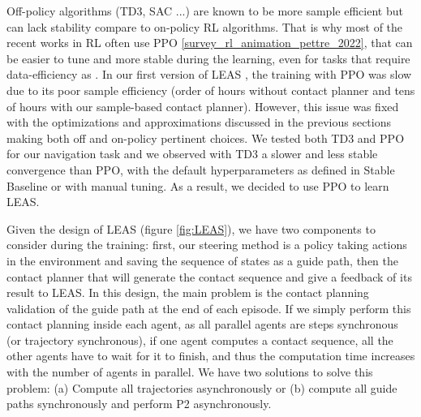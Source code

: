 Off-policy algorithms (TD3, SAC \cite{SAC} ...) are known to be more sample efficient but can lack stability compare to on-policy RL algorithms.
That is why most of the recent works in RL often use PPO \ref{survey_rl_animation_pettre_2022}, that can be easier to tune and more stable during the learning, even for tasks that require data-efficiency as \cite{openai2019dota}.
In our first version of LEAS \cite{LEAS}, the training with PPO was slow due to its poor sample efficiency (order of hours without contact planner and tens of hours with our sample-based contact planner). %
However, this issue was fixed with the optimizations and approximations discussed in the previous sections making both off and on-policy pertinent choices.
We tested both TD3 and PPO for our navigation task and we observed with TD3 a slower and less stable convergence than PPO, with the default hyperparameters as defined in Stable Baseline or with manual tuning.
As a result, we decided to use PPO to learn LEAS.

Given the design of LEAS (figure \ref{fig:LEAS}), we have two components to consider during the training: first, our steering method is a policy taking actions in the environment and saving the sequence of states as a guide path, then the contact planner that will generate the contact sequence and give a feedback of its result to LEAS. 
In this design, the main problem is the contact planning validation of the guide path at the end of each episode. 
If we simply perform this contact planning inside each agent, as all parallel agents are steps synchronous (or trajectory synchronous), if one agent computes a contact sequence, all the other agents have to wait for it to finish, and thus the computation time increases with the number of agents in parallel.
We have two solutions to solve this problem: (a) Compute all trajectories asynchronously or (b) compute all guide paths synchronously and perform P2 asynchronously.

